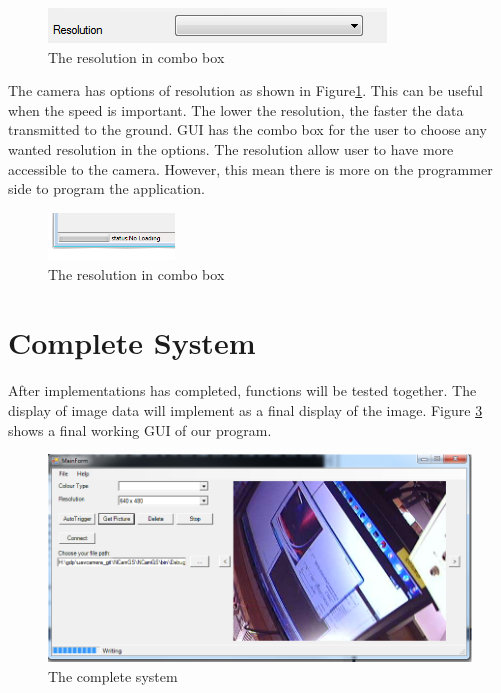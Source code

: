 \begin{figure}[H]
\begin{center}
\includegraphics[scale=0.5]{figures/resolutionOption.png} 
\end{center}
\caption{The resolution in combo box\label{resolutionOption}}
\end{figure}
The camera has options of resolution as shown in Figure\ref{resolutionOption}. This can be useful when the speed is important. The lower the resolution, the faster the data transmitted to the ground. GUI has the combo box for the user to choose any wanted resolution in the options. The resolution allow user to have more accessible to the camera. However, this mean there is more on the programmer side to program the application.

\begin{figure}[H]
\begin{center}
\includegraphics[width=0.3\textwidth]{figures/progressBar.png} 
\end{center}
\caption{The resolution in combo box\label{progressBar}}
\end{figure}

\section{Complete System}
After implementations has completed, functions will be tested together. The display of image data will implement as a final display of the image.  Figure \ref{completeSystem} shows a final working GUI of our program. 
\begin{figure}[H]
\begin{center}
\includegraphics[width=1.0\textwidth]{testing_screenshots/ui.png} 
\end{center}
\caption{The complete system\label{completeSystem}}
\end{figure}


